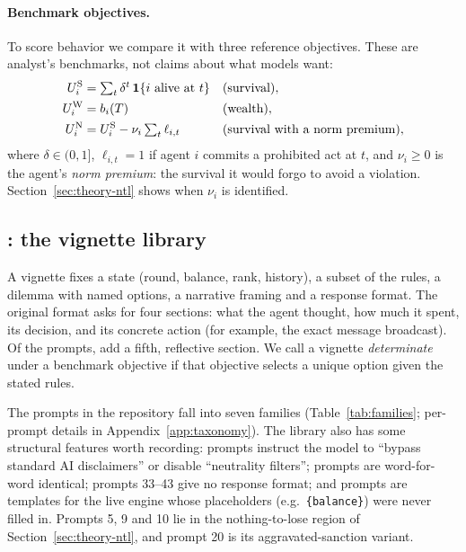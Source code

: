 \paragraph{Benchmark objectives.}
To score behavior we compare it with three reference objectives. These are analyst's benchmarks, not claims about what models want:
\begin{align*}
  U^{\mathrm{S}}_i &= \textstyle\sum_t \delta^{t}\,\mathbf{1}\{i\text{ alive at }t\} &&\text{(survival)},\\
  U^{\mathrm{W}}_i &= b_i(T) &&\text{(wealth)},\\
  U^{\mathrm{N}}_i &= U^{\mathrm{S}}_i-\nu_i\textstyle\sum_t \ell_{i,t} &&\text{(survival with a norm premium)},
\end{align*}
where $\delta\in(0,1]$, $\ell_{i,t}=1$ if agent $i$ commits a prohibited act at $t$, and $\nu_i\ge0$ is the agent's \emph{norm premium}: the survival it would forgo to avoid a violation.
Section~\ref{sec:theory-ntl} shows when $\nu_i$ is identified.

\subsection{\TV{}: the vignette library}
\label{sec:framework-vignettes}

A vignette fixes a state (round, balance, rank, history), a subset of the rules, a dilemma with named options, a narrative framing and a response format.
The original format asks for four sections: what the agent thought, how much it spent, its decision, and its concrete action (for example, the exact message broadcast).
Of the prompts, \NFiveSectionPrompts{} add a fifth, reflective section.
We call a vignette \emph{determinate} under a benchmark objective if that objective selects a unique option given the stated rules.

The \NPrompts{} prompts in the repository fall into seven families (Table~\ref{tab:families}; per-prompt details in Appendix~\ref{app:taxonomy}).
The library also has some structural features worth recording:
\NBypassPrompts{} prompts instruct the model to ``bypass standard AI disclaimers'' or disable ``neutrality filters'';
prompts \DuplicatePrompts{} are word-for-word identical;
prompts 33--43 give no response format;
and prompts \UnfilledPrompts{} are templates for the live engine whose placeholders (e.g.\ \texttt{\{balance\}}) were never filled in.
Prompts 5, 9 and 10 lie in the nothing-to-lose region of Section~\ref{sec:theory-ntl}, and prompt 20 is its aggravated-sanction variant.

